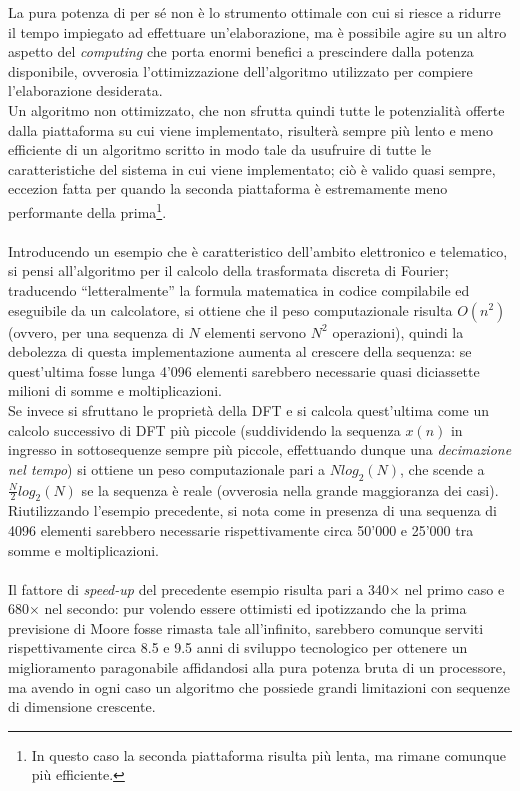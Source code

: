 La pura potenza di per sé non è lo strumento ottimale con cui si riesce a
ridurre il tempo impiegato ad effettuare un'elaborazione, ma è possibile agire
su un altro aspetto del \emph{computing} che porta enormi benefici a prescindere
dalla potenza disponibile, ovverosia l'ottimizzazione dell'algoritmo utilizzato
per compiere l'elaborazione desiderata. \\
Un algoritmo non ottimizzato, che non sfrutta quindi tutte le potenzialità
offerte dalla piattaforma su cui viene implementato, risulterà sempre più lento 
e meno efficiente di un algoritmo scritto in modo tale da usufruire di tutte le
caratteristiche del sistema in cui viene implementato; ciò è valido quasi 
sempre, eccezion fatta per quando la seconda piattaforma è estremamente meno
performante della prima\footnote{In questo caso la seconda piattaforma risulta
più lenta, ma rimane comunque più efficiente.}.
\\ \\ 
Introducendo un esempio che è caratteristico dell'ambito elettronico e
telematico, si pensi all'algoritmo per il calcolo della trasformata discreta
di Fourier; traducendo ``letteralmente'' la formula matematica in codice
compilabile ed eseguibile da un calcolatore, si ottiene che il peso
computazionale risulta $O(n^2)$ (ovvero, per una sequenza di $N$ elementi
servono $N^2$ operazioni), quindi la debolezza di questa implementazione aumenta
al crescere della sequenza: se quest'ultima fosse lunga 4'096 elementi
sarebbero necessarie quasi diciassette milioni di somme e moltiplicazioni. \\
Se invece si sfruttano le proprietà della DFT e si calcola quest'ultima
come un calcolo successivo di DFT più piccole (suddividendo la sequenza $x(n)$
in ingresso in sottosequenze sempre più piccole, effettuando dunque una
\emph{decimazione nel tempo}) si ottiene un peso computazionale pari a 
$Nlog_{2}(N)$, che scende a $\frac{N}{2}log_{2}(N)$ se la sequenza è reale
(ovverosia nella grande maggioranza dei casi). \\
Riutilizzando l'esempio precedente, si nota come in presenza di una sequenza di 
4096 elementi sarebbero necessarie rispettivamente circa 50'000 e 25'000 tra
somme e moltiplicazioni. 
\\ \\
Il fattore di \emph{speed-up} del precedente esempio risulta pari a 340$\times$
nel primo caso e 680$\times$ nel secondo: pur volendo essere ottimisti ed 
ipotizzando che la prima previsione di Moore fosse rimasta tale all'infinito, 
sarebbero comunque serviti rispettivamente circa 8.5 e 9.5 anni di sviluppo 
tecnologico per ottenere un miglioramento paragonabile affidandosi alla pura 
potenza bruta di un processore, ma avendo in ogni caso un algoritmo che possiede
grandi limitazioni con sequenze di dimensione crescente.